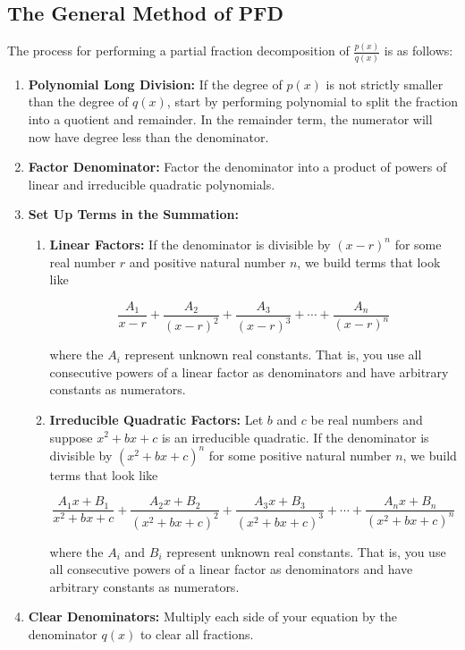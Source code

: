\subsection{The General Method of PFD}
The process for performing a partial fraction decomposition of $\frac{p(x)}{q(x)}$ is as follows:

\begin{enumerate}
\item {\bf Polynomial Long Division:} If the degree of $p(x)$ is not strictly smaller than the degree of $q(x)$, start by performing polynomial  to split the fraction into a quotient and remainder.  In the remainder term, the numerator will now have degree less than the denominator. 

\item {\bf Factor Denominator:} Factor the denominator into a product of powers of linear and irreducible quadratic polynomials.

\item {\bf Set Up Terms in the Summation:}
\begin{enumerate}
\item {\bf Linear Factors:}  If the denominator is divisible by $(x-r)^n$ for some real number $r$ and positive natural number $n$, we build terms that look like

$$\frac{A_1}{x-r}+\frac{A_2}{(x-r)^2}+\frac{A_3}{(x-r)^3}+\cdots+\frac{A_n}{(x-r)^n} $$

where the $A_i$ represent unknown real constants.  That is, you use all consecutive powers of a linear factor as denominators and have arbitrary constants as numerators.
\item {\bf Irreducible Quadratic Factors:}  Let $b$ and $c$ be real numbers and suppose $x^2+bx+c$ is an irreducible quadratic.  If the denominator is divisible by $(x^2+bx+c)^n$ for some positive natural number $n$, we build terms that look like

$$\frac{A_1x+B_1}{x^2+bx+c}+\frac{A_2x+B_2}{(x^2+bx+c)^2}+\frac{A_3x+B_3}{(x^2+bx+c)^3}+\cdots+\frac{A_nx+B_n}{(x^2+bx+c)^n} $$

where the $A_i$ and $B_i$ represent unknown real constants.  That is, you use all consecutive powers of a linear factor as denominators and have arbitrary constants as numerators.

\end{enumerate}


\item {\bf Clear Denominators:} Multiply each side of your equation by the denominator $q(x)$ to clear all fractions.


\end{enumerate}
